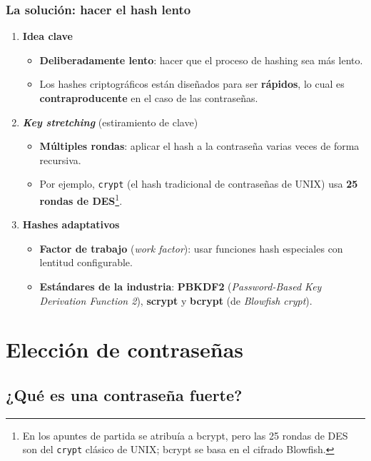 \documentclass[11pt,a4paper]{report}
\begin{document}
\subsection{La solución: hacer el hash lento}
\begin{enumerate}
  \item \textbf{Idea clave}
    \begin{itemize}
      \item \textbf{Deliberadamente lento}: hacer que el proceso de hashing sea más lento.
      \item Los hashes criptográficos están diseñados para ser \textbf{rápidos}, lo cual es \textbf{contraproducente} en el caso de las contraseñas.
    \end{itemize}
  \item \textbf{\emph{Key stretching}} (estiramiento de clave)
    \begin{itemize}
      \item \textbf{Múltiples rondas}: aplicar el hash a la contraseña varias veces de forma recursiva.
      \item Por ejemplo, \texttt{crypt} (el hash tradicional de contraseñas de UNIX) usa \textbf{25 rondas de DES}\footnote{En los apuntes de partida se atribuía a bcrypt, pero las 25 rondas de DES son del \texttt{crypt} clásico de UNIX; bcrypt se basa en el cifrado Blowfish.}.
    \end{itemize}
  \item \textbf{Hashes adaptativos}
    \begin{itemize}
      \item \textbf{Factor de trabajo} (\emph{work factor}): usar funciones hash especiales con lentitud configurable.
      \item \textbf{Estándares de la industria}: \textbf{PBKDF2} (\emph{Password-Based Key Derivation Function 2}), \textbf{scrypt} y \textbf{bcrypt} (de \emph{Blowfish crypt}).
    \end{itemize}
\end{enumerate}
 
\chapter{Elección de contraseñas}
 
\section{¿Qué es una contraseña fuerte?}
 
\end{document}
